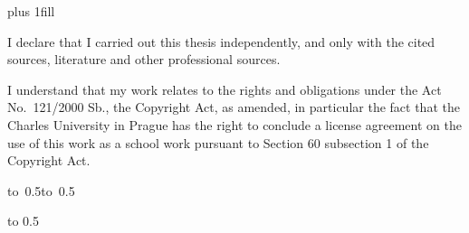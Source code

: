 
\openright
\hypersetup{pageanchor=true}
\pagestyle{plain}
\vglue 0pt plus 1fill

\noindent
I declare that I carried out this \ThesisType{} thesis independently, and only with the cited
sources, literature and other professional sources.

\medskip\noindent
I understand that my work relates to the rights and obligations under the Act No.~121/2000 Sb.,
the Copyright Act, as amended, in particular the fact that the Charles
University in Prague has the right to conclude a license agreement on the use of this
work as a school work pursuant to Section 60 subsection 1 of the Copyright Act.

\vspace{10mm}

\hbox{\hbox to 0.5\hbox to 0.5}

\vspace{20mm}
\newpage


\openright

\vbox to 0.5

\newpage


\openright

\noindent
\Dedication

\newpage

\openright
\pagestyle{plain}
\setcounter{page}{1}
